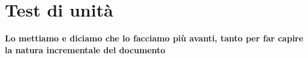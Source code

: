 \section{Test di unità}
\textbf{Lo mettiamo e diciamo che lo facciamo più avanti, tanto per far capire la natura incrementale del documento}